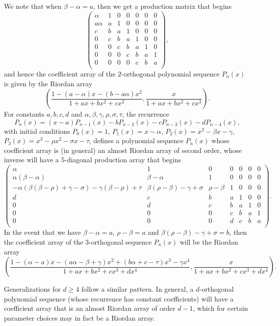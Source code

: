 \documentclass[12pt,reqno]{article}
\theoremstyle{definition}
\begin{document}
We note that when $\beta-\alpha=a$, then we get a production matrix that begins
$$\left(
\begin{array}{ccccccc}
\alpha & 1 & 0 & 0 & 0 & 0 & 0 \\
a\alpha & a & 1 & 0 & 0 & 0 & 0 \\
c & b & a & 1 & 0 & 0 & 0 \\
0 & c & b & a & 1 & 0 & 0 \\
0 & 0 & c & b & a & 1 & 0 \\
0 & 0 & 0 & c & b & a & 1 \\
0 & 0 & 0 & 0 & c & b & a \\
\end{array}\right),$$ and hence the coefficient array of the $2$-orthogonal polynomial sequence $P_n(x)$ is given by the Riordan array
$$\left(\frac{1-(a-\alpha)x-(b-a \alpha)x^2}{1+ax+bx^2+cx^2}, \frac{x}{1+ax+bx^2+cx^3}\right).$$
For constants $a,b,c,d$ and $\alpha,\beta,\gamma,\rho,\sigma,\tau$, the recurrence
$$P_n(x)=(x-a)P_{n-1}(x)-b P_{n-2}(x)-c P_{n-3}(x)-d P_{n-4}(x),$$ with initial conditions $P_0(x)=1$, $P_1(x)=x-\alpha$, $P_2(x)=x^2-\beta x - \gamma$, $P_3(x)=x^3-\rho x^2- \sigma x-\tau$, defines a polynomial sequence $P_n(x)$ whose coefficient array is (in general) an almost Riordan array of second order, whose inverse will have a $5$-diagonal production array that begins
$$\left(
\begin{array}{ccccccc}
\alpha  & 1 & 0 & 0 & 0 & 0 & 0 \\
\alpha(\beta-\alpha) & \beta-\alpha & 1 & 0 & 0 & 0 & 0 \\
-\alpha(\beta(\beta-\rho)+\gamma-\sigma)-\gamma(\beta-\rho)+\tau & \beta(\rho-\beta)-\gamma+\sigma & \rho-\beta & 1 & 0 & 0 & 0 \\
d & c & b & a & 1 & 0 & 0 \\
0 & d & c & b & a & 1 & 0 \\
0 & 0 & 0 & c & b & a & 1 \\
0 & 0 & 0 & d & c & b & a \\
\end{array}\right).$$
In the event that we have $\beta-\alpha=a$, $\rho-\beta=a$ and $\beta(\rho-\beta)-\gamma+\sigma=b$, then the coefficient array of the $3$-orthogonal sequence $P_n(x)$ will be the Riordan array
$$\left(\frac{1-(\alpha-a)x-(a \alpha-\beta+\gamma)x^2+(b\alpha +c-\tau)x^3-\gamma x^4}{1+ax+bx^2+cx^3+dx^4}, \frac{x}{1+ax+bx^2+cx^3+dx^4}\right).$$

Generalizations for $d \ge 4$ follow a similar pattern. In general, a $d$-orthogonal polynomial sequence (whose recurrence has constant coefficients) will have a coefficient array that is an almost Riordan array of order $d-1$, which for certain parameter choices may in fact be a Riordan array.
\end{document}
